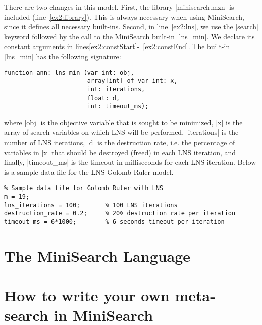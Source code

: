 \documentclass[a4paper,13pt,onecolumn]{article}%
\begin{document}
There are two changes in this model.
First, the library \mzninline|minisearch.mzn| is included (line~\ref{ex2:library}). This
is always necessary when using MiniSearch, since it defines all necessary built-ins. 
Second, in line~\ref{ex2:lns}, we use the \mzninline|search| keyword
followed by the call to the MiniSearch built-in \mzninline|lns_min|. We declare its constant arguments 
in lines\ref{ex2:constStart}-~\ref{ex2:constEnd}.
The built-in  \mzninline|lns_min| has  the following signature:
\begin{lstlisting}
function ann: lns_min (var int: obj, 
                       array[int] of var int: x,
                       int: iterations, 
                       float: d,
                       int: timeout_ms);
\end{lstlisting}
where \mzninline|obj| is the objective variable that is sought to be minimized,
\mzninline|x| is the array of search variables on which LNS will be performed,
\mzninline|iterations| is the number of LNS iterations, \mzninline|d| is the 
destruction rate, i.e. the percentage of variables in \mzninline|x| that 
should be destroyed (freed) in each LNS iteration, and finally, 
\mzninline|timeout_ms| is the timeout in milliseconds for each 
LNS iteration. Below is a sample data file for the LNS Golomb Ruler model.
\begin{lstlisting}
% Sample data file for Golomb Ruler with LNS
m = 19;                    
lns_iterations = 100;       % 100 LNS iterations
destruction_rate = 0.2;     % 20% destruction rate per iteration
timeout_ms = 6*1000;        % 6 seconds timeout per iteration
\end{lstlisting}


\section{The MiniSearch Language}
\label{sec:minisearch}


\section{How to write your own meta-search in MiniSearch}
\label{sec:ownsearch}
\end{document}
